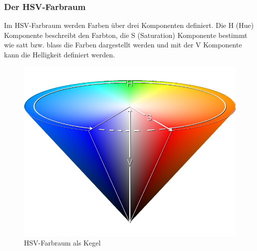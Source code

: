 \documentclass[a4paper,12pt]{article}
\begin{document}
\subsubsection{Der HSV-Farbraum}
Im HSV-Farbraum werden Farben über drei Komponenten definiert.
Die H (Hue) Komponente beschreibt den Farbton, die S (Saturation) Komponente bestimmt wie satt bzw. blass die Farben dargestellt werden und mit der V Komponente kann die Helligkeit definiert werden.
\begin{figure}[H]
\includegraphics[scale=0.3]{hsv-farbraum.png}
\caption{HSV-Farbraum als Kegel}
\label{fig:hsv-farbraum}
\end{figure}
\end{document}
